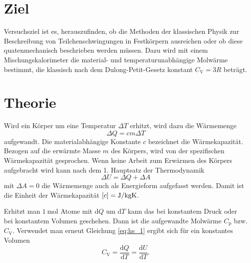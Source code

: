 \section{Ziel}

Versuchsziel ist es, herauszufinden, ob die Methoden der klassischen Physik zur Beschreibung von Teilchenschwingungen in Festkörpern ausreichen oder ob diese quatenmechanisch beschrieben werden müssen. Dazu wird mit einem Mischungskalorimeter die material- und temperaturunabhängige Molwärme bestimmt, die klassisch nach dem Dulong-Petit-Gesetz konstant $C_\mathup{V}=3R$ beträgt.
\section{Theorie}
\label{sec:Theorie}

Wird ein Körper  um eine Temperatur $\Delta{T}$ erhitzt, wird dazu die Wärmemenge 
\begin{equation}
\Delta{Q}=c m \Delta{T}
\label{eq:waermekapazitaet}
\end{equation}
aufgewandt. Die materialabhängige Konstante $c$ bezeichnet die Wärmekapazität. Bezogen auf die erwärmte Masse $m$ des Körpers, wird von der spezifischen Wärmekapazität gesprochen.
Wenn keine Arbeit zum Erwärmen des Körpers aufgebracht wird kann nach dem 1. Hauptsatz der Thermodynamik
\begin{equation}
	\Delta{U}=\Delta{Q}+\Delta{A}
	\label{eq:hs_1}
\end{equation}
mit $\Delta{A}=0$ die Wärmemenge auch als Energieform aufgefasst werden. Damit ist die Einheit der Wärmekapazität $[c]=\si{\joule\per{\kilo\gram\kelvin}}$.

Erhitzt man $\SI{1}{\mol}$ Atome mit  d$Q$ um d$T$ kann das bei konstantem Druck oder bei konstantem Volumen geschehen.
 Dann ist die aufgewandte Molwärme $C_\mathup{p}$ bzw. $C_\mathup{V}$. 
Verwendet man erneut Gleichung \eqref{eq:hs_1} 
ergibt sich für ein konstantes Volumen 
\begin{equation}
	C_\mathup{V}=\frac{\mathup{d}{Q}}{\mathup{d}{T}}=\frac{\mathup{d}{U}}{\mathup{d}{T}}.
	\label{eq:molwaerme}
\end{equation}

